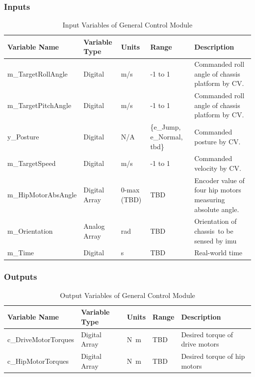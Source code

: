 \documentclass[12pt]{article}
\begin{document}
        \subsubsection{Inputs}
            \begin{table}[H]
              \centering
                \caption{Input Variables of General Control Module} \label{tbl:Input Variables of General Control Module}
              \begin{tabularx}{\textwidth}{|p{5cm}|p{1.5cm}|p{2cm}|p{2cm}|X|}
                \hline Variable Name & Variable Type & Units & Range & Description \\
                \hline m\_TargetRollAngle & Digital & m/s & -1 to 1 & Commanded roll angle of chassis platform by CV.\\
                \hline m\_TargetPitchAngle & Digital & m/s & -1 to 1 & Commanded roll angle of chassis platform by CV.\\
                \hline y\_Posture & Digital & N/A &\{e\_Jump, e\_Normal, \acrshort{tbd}\} & Commanded posture by CV.  \\
                \hline m\_TargetSpeed & Digital & m/s & -1 to 1 & Commanded velocity by CV.\\
                \hline m\_HipMotorAbsAngle & Digital Array & 0-max (TBD) & TBD & Encoder value of four hip motors\, measuring absolute angle.\\
                \hline m\_Orientation         & Analog Array  & \unit{\radian} & TBD & Orientation of chassis\, to be sensed by \acrshort{imu}\\
                \hline m\_Time & Digital & \unit{\second}  & TBD & Real-world time\\
                \hline
              \end{tabularx}
            \end{table}
        \subsubsection{Outputs}
            \begin{table}[H]
              \centering
                \caption{Output Variables of General Control Module} \label{tbl:Output Variables of General Control Module}
              \begin{tabularx}{\textwidth}{|p{5cm}|p{1.2cm}|p{1.2cm}|p{1cm}|X|}
                \hline Variable Name & Variable Type & Units & Range & Description \\
                \hline c\_DriveMotorTorques   & Digital Array & \unit{N.m} & TBD & Desired torque of drive motors \\
                \hline c\_HipMotorTorques     & Digital Array & \unit{N.m} & TBD & Desired torque of hip motors   \\
                \hline
              \end{tabularx}
            \end{table}
\end{document}
